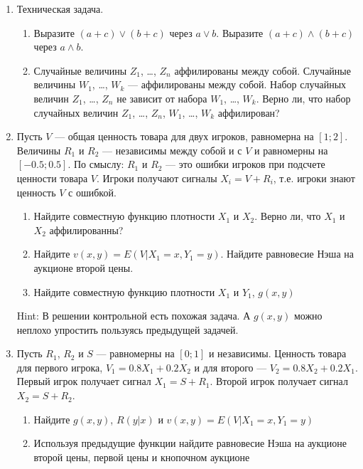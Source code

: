 \documentclass[pdftex,12pt,a4paper]{article}
\begin{document}
\begin{enumerate}


\item Техническая задача.
\begin{enumerate}
\item Выразите $ (a+c)\vee (b+c) $ через $ a\vee b $. Выразите $ (a+c)\wedge (b+c) $ через $ a\wedge b $.
\item Случайные величины $ Z_{1} $, \ldots, $ Z_{n} $ аффилированы между собой. Случайные величины $ W_{1} $, \ldots, $ W_{k} $ --- аффилированы между собой. Набор случайных величин $ Z_{1} $, \ldots, $ Z_{n} $ не зависит от набора $ W_{1} $, \ldots, $ W_{k} $. Верно ли, что набор случайных величин $ Z_{1} $, \ldots, $ Z_{n} $, $ W_{1} $, \ldots, $ W_{k} $ аффилирован?
\end{enumerate}


\item Пусть $  V $ --- общая ценность товара для двух игроков, равномерна на $ [1;2] $. Величины $ R_{1} $ и $ R_{2} $ --- независимы между собой и с $ V $ и равномерны на $ [-0.5;0.5] $. По смыслу: $ R_{1} $ и $ R_{2} $ --- это ошибки игроков при подсчете ценности товара $ V $. Игроки получают сигналы $ X_{i}=V+R_{i} $, т.е. игроки знают ценность  $ V $ с ошибкой.
\begin{enumerate}
\item Найдите совместную функцию плотности $ X_{1} $ и $ X_{2} $. Верно ли, что $ X_{1} $ и $ X_{2} $ аффилированны?
\item Найдите $ v(x,y)=E(V|X_{1}=x,Y_{1}=y) $. Найдите равновесие Нэша на аукционе второй цены.
\item Найдите совместную функцию плотности $ X_{1} $ и $ Y_{1} $, $ g(x,y) $
\end{enumerate} 

Hint: В решении контрольной есть похожая задача. А $ g(x,y) $ можно неплохо упростить пользуясь предыдущей задачей.

\item Пусть $ R_{1} $, $ R_{2} $ и $ S $ --- равномерны на $ [0;1] $ и независимы. Ценность товара для первого игрока, $ V_{1}=0.8X_{1}+0.2X_{2} $ и для второго --- $ V_{2}=0.8X_{2}+0.2X_{1} $. Первый игрок получает сигнал $ X_{1}=S+R_{1} $. Второй игрок получает сигнал $ X_{2}=S+R_{2} $.
\begin{enumerate}
\item Найдите $ g(x,y) $, $ R(y|x) $ и $ v(x,y)=E(V|X_{1}=x,Y_{1}=y) $ 
\item Используя предыдущие функции найдите равновесие Нэша на аукционе второй цены, первой цены и кнопочном аукционе
\end{enumerate}


\end{enumerate}
\end{document}
